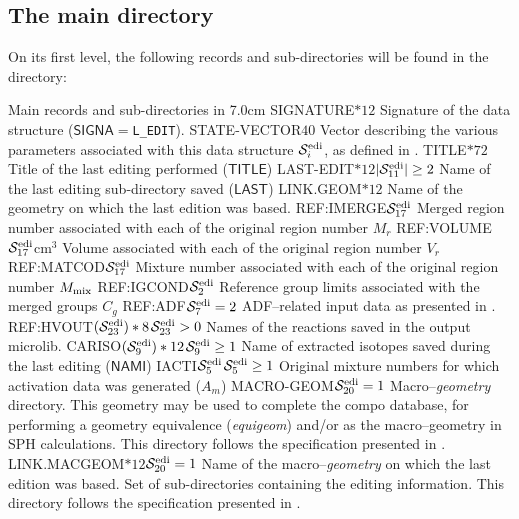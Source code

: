 \subsection{The main  directory}\label{sect:editiondirmain}

On its first level, the
following records and sub-directories will be found in the  directory:

\begin{DescriptionEnregistrement}{Main records and sub-directories in }{7.0cm}
\CharEnr
  {SIGNATURE}{$*12$}
  {Signature of the data structure ($\mathsf{SIGNA}=${\tt L\_EDIT}).}
\IntEnr
  {STATE-VECTOR}{$40$}
  {Vector describing the various parameters associated with this data structure $\mathcal{S}^{\rm edi}_{i}$,
  as defined in .}
\CharEnr
  {TITLE}{$*72$}
  {Title of the last editing performed ($\mathsf{TITLE}$) }
\OptCharEnr
  {LAST-EDIT}{$*12$}{$|\mathcal{S}^{\rm edi}_{11}|\ge 2$}
  {Name of the last editing sub-directory saved ($\mathsf{LAST}$)}
\CharEnr
  {LINK.GEOM}{$*12$}
  {Name of the {\sc geometry} on which the last edition was based.}
\IntEnr
  {REF:IMERGE}{$\mathcal{S}^{\rm edi}_{17}$}
  {Merged region number associated with each of the original region number $M_{r}$}
\RealEnr
  {REF:VOLUME}{$\mathcal{S}^{\rm edi}_{17}$}{cm$^{3}$}
  {Volume associated with each of the original region number $V_{r}$}
\IntEnr
  {REF:MATCOD}{$\mathcal{S}^{\rm edi}_{17}$}
  {Mixture number associated with each of the original region number $M_{\rm mix}$}
\IntEnr
  {REF:IGCOND}{$\mathcal{S}^{\rm edi}_{2}$}
  {Reference group limits associated with the merged groups $C_{g}$}
\OptDirEnr
  {REF:ADF}{$\mathcal{S}^{\rm edi}_{7} = 2$}
  {ADF--related input data as presented in .}
\OptCharEnr
  {REF:HVOUT}{$(\mathcal{S}^{\rm edi}_{23})*8$}{$\mathcal{S}^{\rm edi}_{23} > 0$}
  {Names of the reactions saved in the output microlib.}
\OptCharEnr
  {CARISO}{$(\mathcal{S}^{\rm edi}_{9})*12$}{$\mathcal{S}^{\rm edi}_{9}\ge 1$}
  {Name of extracted isotopes saved during the last editing ($\mathsf{NAMI}$)}
\OptIntEnr
  {IACTI}{$\mathcal{S}^{\rm edi}_{5}$}{$\mathcal{S}^{\rm edi}_{5}\ge 1$}
  {Original mixture numbers for which activation data was generated ($A_{m}$)}
\OptDirEnr
  {MACRO-GEOM}{$\mathcal{S}^{\rm edi}_{20} = 1$}
  {Macro--{\sl geometry} directory. This geometry may be used to complete the {\sc compo} database, for performing
  a geometry equivalence ({\sl equigeom}) and/or as the macro--geometry in SPH calculations. This directory follows
  the specification presented in .}
\OptCharEnr
  {LINK.MACGEOM}{$*12$}{$\mathcal{S}^{\rm edi}_{20} = 1$}
  {Name of the macro--{\sl geometry} on which the last edition was based.}
\DirVar
  {}
  {Set of sub-directories containing the editing information. This directory follows
  the specification presented in .}
\end{DescriptionEnregistrement}

